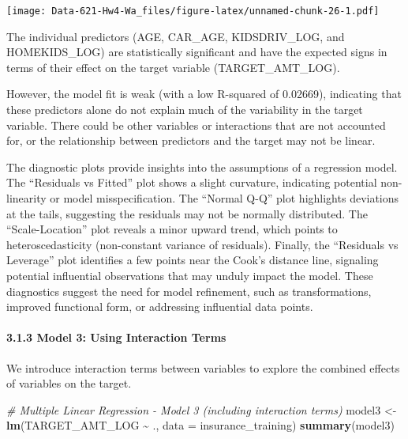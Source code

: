 \documentclass[
]{article}
\newenvironment{Shaded}{\begin{snugshade}}{\end{snugshade}}
\newcommand{\AttributeTok}[1]{\textcolor[rgb]{0.13,0.29,0.53}{#1}}
\newcommand{\CommentTok}[1]{\textcolor[rgb]{0.56,0.35,0.01}{\textit{#1}}}
\newcommand{\FunctionTok}[1]{\textcolor[rgb]{0.13,0.29,0.53}{\textbf{#1}}}
\newcommand{\NormalTok}[1]{#1}
\newcommand{\OtherTok}[1]{\textcolor[rgb]{0.56,0.35,0.01}{#1}}
\newcommand{\SpecialCharTok}[1]{\textcolor[rgb]{0.81,0.36,0.00}{\textbf{#1}}}
\begin{document}
\texttt{[image: Data-621-Hw4-Wa\_files/figure-latex/unnamed-chunk-26-1.pdf]}

The individual predictors (AGE, CAR\_AGE, KIDSDRIV\_LOG, and
HOMEKIDS\_LOG) are statistically significant and have the expected signs
in terms of their effect on the target variable (TARGET\_AMT\_LOG).

However, the model fit is weak (with a low R-squared of 0.02669),
indicating that these predictors alone do not explain much of the
variability in the target variable. There could be other variables or
interactions that are not accounted for, or the relationship between
predictors and the target may not be linear.

The diagnostic plots provide insights into the assumptions of a
regression model. The ``Residuals vs Fitted'' plot shows a slight
curvature, indicating potential non-linearity or model misspecification.
The ``Normal Q-Q'' plot highlights deviations at the tails, suggesting
the residuals may not be normally distributed. The ``Scale-Location''
plot reveals a minor upward trend, which points to heteroscedasticity
(non-constant variance of residuals). Finally, the ``Residuals vs
Leverage'' plot identifies a few points near the Cook's distance line,
signaling potential influential observations that may unduly impact the
model. These diagnostics suggest the need for model refinement, such as
transformations, improved functional form, or addressing influential
data points.

\paragraph{3.1.3 Model 3: Using Interaction
Terms}\label{model-3-using-interaction-terms}

We introduce interaction terms between variables to explore the combined
effects of variables on the target.

\begin{Shaded}
\begin{Highlighting}[]
\CommentTok{\# Multiple Linear Regression {-} Model 3 (including interaction terms)}
\NormalTok{model3 }\OtherTok{\textless{}{-}} \FunctionTok{lm}\NormalTok{(TARGET\_AMT\_LOG }\SpecialCharTok{\textasciitilde{}}\NormalTok{ ., }\AttributeTok{data =}\NormalTok{ insurance\_training)}
\FunctionTok{summary}\NormalTok{(model3)}
\end{Highlighting}
\end{Shaded}
\end{document}
